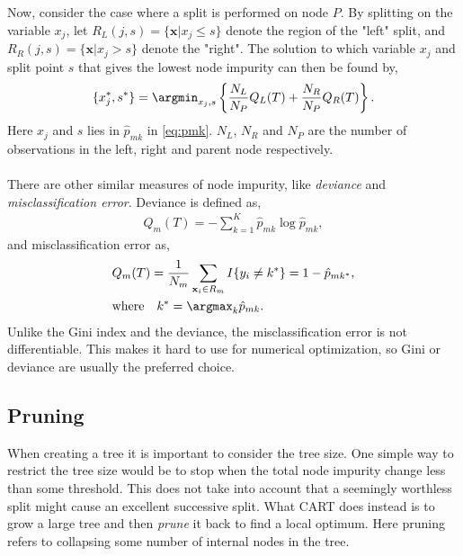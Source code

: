 Now, consider the case where a split is performed on node $P$. By splitting on the variable $x_j$, let $R_L(j,s) = \{\mathbf{x} | x_j \leq s\}$ denote the region of the "left" split,  and $R_R(j,s) = \{\mathbf{x} | x_j > s\}$ denote the "right". The solution to which variable $x_j$ and split point $s$ that gives the lowest node impurity can then be found by,
\begin{align}
  \{x_j^*, s^*\} = \argmin_{x_j,s} \left\{ \frac{N_L}{N_P} Q_L(T)
  + \frac{N_R}{N_P} Q_R(T) \right\}.
\end{align}
Here $x_j$ and $s$ lies in $\hat{p}_{mk}$ in \eqref{eq:pmk}. $N_L$, $N_R$ and $N_P$ are the number of observations in the left, right and parent node respectively.
\\
\\
There are other similar measures of node impurity, like \textit{deviance} and \textit{misclassification error}. Deviance is defined as,
\begin{align}
  Q_m(T) = -  \sum^{K}_{k=1} \hat p_{m k} \log \hat p_{m k},
\end{align}
and misclassification error as,
\begin{align}
  \label{eq:CARTmisclass} 
  &Q_m(T) = \frac{1}{N_m} \sum_{\mathbf{x}_i \in R_m} I\{y_i \neq k^*\} = 1 - \hat p_{m k^*},\\
  &\text{where} \quad k^* = \argmax_k \hat p_{m k}. \notag
\end{align}
Unlike the Gini index and the deviance, the misclassification error is not differentiable. This makes it hard to use for numerical optimization, so Gini or deviance are usually the preferred choice. 

\subsection{Pruning}
\label{sub:Pruning}

When creating a tree it is important to consider the tree size. One simple way to restrict the tree size would be to stop when the total node impurity change less than some threshold. This does not take into account that a seemingly worthless split might cause an excellent successive split. 
What CART does instead is to grow a large tree and then \textit{prune} it back to find a local optimum. Here pruning refers to collapsing some number of internal nodes in the tree. 

